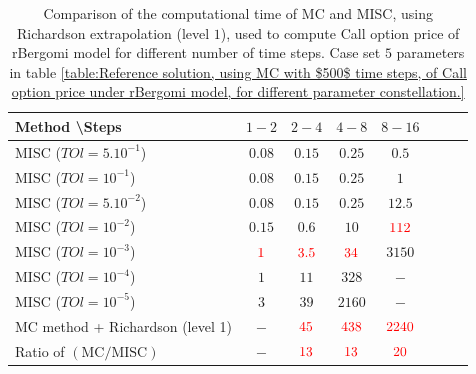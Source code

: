 \documentclass[11pt]{article}
\begin{document}
\begin{table}[h!]
	\centering
	\begin{tabular}{l*{6}{c}r}
		Method \textbackslash  Steps            & $1-2$ & $2-4$ & $4-8$ & $8-16$ &   \\
		\hline
		MISC ($TOl=5.10^{-1}$)   & $0.08$ & $0.15$ & $0.25$ & $0.5$  \\
		MISC ($TOl=10^{-1}$)   &$0.08$ &  $0.15$ & $0.25$ & $1$  \\
		MISC ($TOl=5.10^{-2}$)  &$0.08$  &  $0.15$ & $0.25$ & $12.5$  \\
		MISC ($TOl=10^{-2}$)   & $0.15$ & $0.6$ & $10$ & ${\color{red}112}$  \\
		MISC ($TOl=10^{-3}$)  & ${\color{red}1}$ & ${\color{red}3.5}$ & ${\color{red}34}$ & $3150$ \\
		MISC ($TOl=10^{-4}$)  & $1$ & $11$ & $328$ & $-$  \\
		MISC ($TOl=10^{-5}$)  & $3$ & $39$ & $2160$ & $-$  \\
		\hline	
			MC method + Richardson (level 1)  &$-$ & ${\color{red}45}$  & ${\color{red}438}$  & ${\color{red}2240}$ \\
			
			\hline
				Ratio of $\left(\text{MC}/ \text{MISC} \right)$  &$-$ & ${\color{red}13}$  & ${\color{red}13}$  & ${\color{red}20}$ \\
		\hline
	\end{tabular}
	\caption{Comparison of the computational time of  MC and MISC, using Richardson extrapolation (level $1$), used to compute Call option price of rBergomi model for different number of time steps. Case set $5$ parameters in table \ref{table:Reference solution, using MC with $500$ time steps, of Call option price under rBergomi model, for different parameter constellation.}}
	\label{Comparsion of the computational time of  MC and MISC, using Richardson extrapolation (level $1$), used to compute Call option price of rBergomi model for different number of time steps. Case set $5$ parameters}
\end{table}
\end{document}
